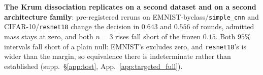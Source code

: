 \documentclass{article}
\begin{document}
\label{sec:targeted_rest}
\noindent \textbf{The Krum dissociation replicates on a second dataset and on a second architecture family}: pre-registered reruns on EMNIST-byclass/\texttt{simple\_cnn} and CIFAR-10/\texttt{resnet18} change the decision in $0.643$ and $0.556$ of rounds, admitted mass stays at zero, and both $n{=}3$ rises fall short of the frozen $0.15$. Both $95\%$ intervals fall short of a plain null: EMNIST's excludes zero, and \texttt{resnet18}'s is wider than the margin, so equivalence there is indeterminate rather than established (supp.\ §\ref{app:tost}, App.~\ref{app:targeted_full}).
\end{document}
